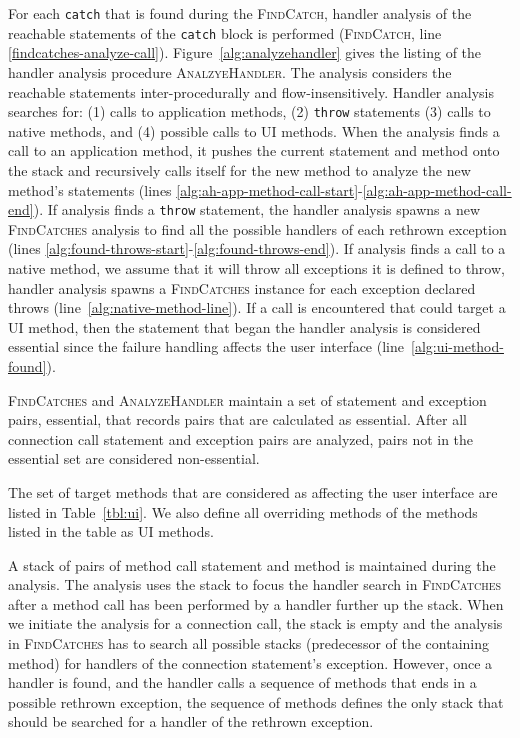 For each \lstinline!catch! that is found during the
\textsc{FindCatch}, handler analysis of the reachable statements of
the \lstinline!catch! block is performed (\textsc{FindCatch}, line
\ref{findcatches-analyze-call}).  Figure~\ref{alg:analyzehandler}
gives the listing of the handler analysis procedure
\textsc{AnalzyeHandler}. The analysis considers the reachable
statements inter-procedurally and flow-insens\-itively.  Handler
analysis searches for: (1) calls to application methods, (2)
\lstinline!throw! statements (3) calls to native methods, and (4)
possible calls to UI methods. When the analysis finds a call to an
application method, it pushes the current statement and method onto
the stack and recursively calls itself for the new method to analyze the
new method's statements (lines
\ref{alg:ah-app-method-call-start}-\ref{alg:ah-app-method-call-end}).
If analysis finds a \lstinline!throw!  statement, the handler analysis
spawns a new \textsc{FindCatches} analysis to find all the
possible handlers of each rethrown exception (lines
\ref{alg:found-throws-start}-\ref{alg:found-throws-end}).  If analysis
finds a call to a native method, we assume that it will throw all
exceptions it is defined to throw, handler analysis spawns a
\textsc{FindCatches} instance for each exception declared throws
(line~\ref{alg:native-method-line}).  If a call is encountered that
could target a UI method, then the statement that began the handler
analysis is considered essential since the failure handling affects the
user interface (line~\ref{alg:ui-method-found}).

\textsc{FindCatches} and \textsc{AnalyzeHandler} maintain a set of
statement and exception pairs, essential, that records pairs that are
calculated as essential.  After all connection call statement and
exception pairs are analyzed, pairs not in the essential set are
considered non-essential.





The set of target methods that are considered as affecting the user
interface are listed in Table~\ref{tbl:ui}.  We also define all
overriding methods of the methods listed in the table as UI methods.

A stack of pairs of method call statement and method is maintained
during the analysis.  The analysis uses the stack to focus the handler
search in \textsc{FindCatches} after a method call has been performed
by a handler further up the stack. When we initiate the analysis for
a connection call, the stack is empty and the analysis in
\textsc{FindCatches} has to search all possible stacks (predecessor of
the containing method) for handlers of the connection statement's
exception.  However, once a handler is found, and the handler calls a
sequence of methods that ends in a possible rethrown exception, the
sequence of methods defines the only stack that should be searched for
a handler of the rethrown exception.  

